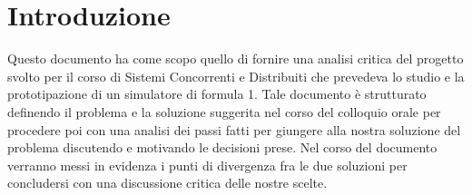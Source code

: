 \section{Introduzione}
Questo documento ha come scopo quello di fornire una analisi critica del progetto svolto per il corso di Sistemi Concorrenti e Distribuiti che prevedeva lo studio e la prototipazione di un simulatore di formula 1. Tale documento è strutturato definendo il problema e la soluzione suggerita nel corso del colloquio orale per procedere poi con una analisi dei passi fatti per giungere alla nostra soluzione del problema discutendo e motivando le decisioni prese. Nel corso del documento verranno messi in evidenza i punti di divergenza fra le due soluzioni per concludersi con una discussione critica delle nostre scelte.